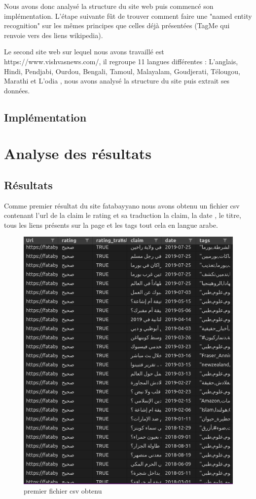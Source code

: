 \documentclass[oneside,13pt,a4paper]{report}
\begin{document}
Nous avons donc analysé la structure du site web puis commencé son implémentation. L'étape suivante fût de trouver comment faire une "named entity recognition" sur les mêmes principes que celles déjà présentées (TagMe qui renvoie vers des liens wikipedia).

Le second site web sur lequel nous avons travaillé est https://www.vishvasnews.com/, il regroupe 11 langues différentes : L'anglais, Hindi, Pendjabi, Ourdou, Bengali, Tamoul, Malayalam, Goudjerati, Télougou, Marathi et L'odia , nous avons analysé la structure du site puis extrait ses données.

\section{Implémentation}

\chapter{Analyse des résultats}

\section{Résultats}
Comme premier résultat du site fatabayyano nous avons obtenu un fichier csv contenant l'url de la claim le rating et sa traduction la claim, la date , le titre, tous les liens présents sur la page et les tags tout cela en langue arabe.
\begin{figure}[h]
	\centering
	\begin{minipage}[c]{.5\linewidth}
		\includegraphics[width=1\textwidth]{img/fatab1.png}
		\caption{premier fichier csv obtenu}
	\end{minipage}
\end{figure}
\end{document}
